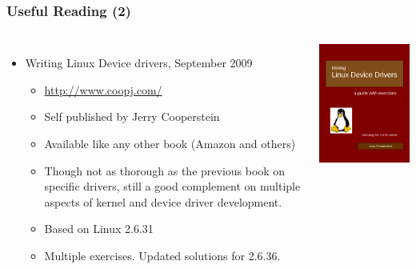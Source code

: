 \begin{frame}
  \frametitle{Useful Reading (2)}
  \begin{columns}
    \begin{itemize}
    \item Writing Linux Device drivers, September 2009
      \begin{itemize}
      \item \url{http://www.coopj.com/}
      \item Self published by Jerry Cooperstein
      \item Available like any other book (Amazon and others)
      \item Though not as thorough as the previous book on specific
        drivers, still a good complement on multiple aspects of kernel
        and device driver development.
      \item Based on Linux 2.6.31
      \item Multiple exercises. Updated solutions for 2.6.36.
      \end{itemize}
    \end{itemize}
    \includegraphics[width=\textwidth]{slides/kernel-resources-references/writing-linux-device-drivers.png}
  \end{columns}
\end{frame}

